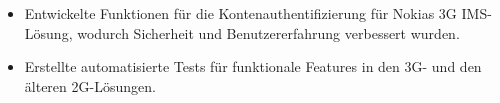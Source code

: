 \begin{itemize}
  \item Entwickelte Funktionen für die Kontenauthentifizierung für Nokias 3G IMS-Lösung, wodurch Sicherheit und Benutzererfahrung verbessert wurden.
  \item Erstellte automatisierte Tests für funktionale Features in den 3G- und den älteren 2G-Lösungen.
\end{itemize}
\divider
